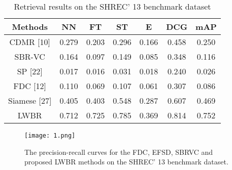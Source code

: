 \documentclass{article}
\begin{document}
\begin{table}[h]
\centering
\begin{tabular}{|c|c|c|c|c|c|c|}
\hline
Methods & NN &FT &ST& E & DCG & mAP\\
\hline
CDMR [10]&0.279&0.203&0.296&0.166&0.458&0.250\\
\hline
SBR-VC&0.164&0.097&0.149&0.085&0.348&0.116\\
\hline
SP [22]&0.017&0.016&0.031&0.018&0.240&0.026\\
\hline
FDC [12]&0.110&0.069&0.107&0.061&0.307&0.086\\
\hline
Siamese [27]&0.405&0.403&0.548&0.287&0.607&0.469\\
\hline
LWBR&0.712&0.725&0.785&0.369&0.814&0.752\\
\hline
\end{tabular}
\caption{Retrieval results on the SHREC' 13 benchmark dataset}
\end{table}

\begin{figure}[ht]
\centering
\texttt{[image: 1.png]}
\caption{The precision-recall curves for the FDC, EFSD, SBRVC
and proposed LWBR methods on the SHREC' 13 benchmark
dataset.}
\end{figure}


\end{document}
